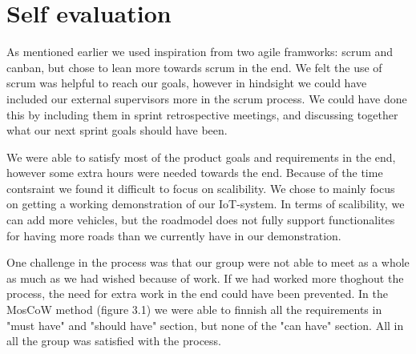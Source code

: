 \section{Self evaluation}

As mentioned earlier we used inspiration from two agile framworks: scrum and canban, but chose to lean more towards scrum in the end. We felt the use of scrum was helpful to reach our goals, however in hindsight we could have included our external supervisors more in the scrum process. We could have done this by including them in sprint retrospective meetings, and discussing together what our next sprint goals should have been.

We were able to satisfy most of the product goals and requirements in the end, however some extra hours were needed towards the end. Because of the time contsraint we found it difficult to focus on scalibility. We chose to mainly focus on getting a working demonstration of our IoT-system. In terms of scalibility, we can add more vehicles, but the roadmodel does not fully support functionalites for having more roads than we currently have in our demonstration. 

One challenge in the process was that our group were not able to meet as a whole as much as we had wished because of work. If we had worked more thoghout the process, the need for extra work in the end could have been prevented. In the MosCoW method (figure 3.1) we were able to finnish all the requirements in "must have" and "should have" section, but none of the "can have" section. All in all the group was satisfied with the process.

